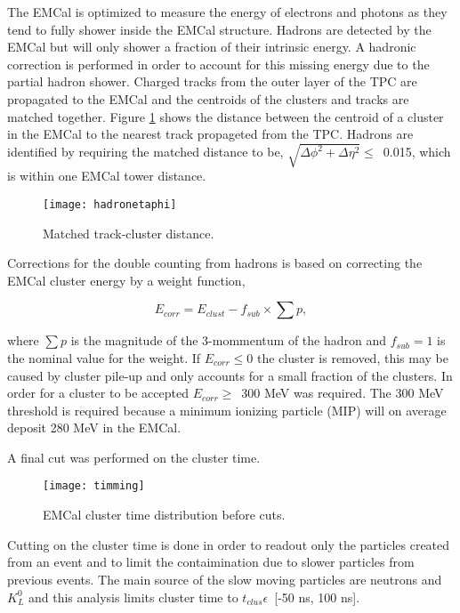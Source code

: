 The EMCal is optimized to measure the energy of electrons and photons as they tend to fully shower inside the EMCal structure.  Hadrons are detected by the EMCal but will only shower a fraction of their intrinsic energy.  A hadronic correction is performed in order to account for this missing energy due to the partial hadron shower.  Charged tracks from the outer layer of the TPC are propagated to the EMCal and the centroids of the clusters and tracks are matched together.  Figure \ref{fig:EMChadetaphi} shows the distance between the centroid of a cluster in the EMCal to the nearest track propageted from the TPC.  Hadrons are identified by requiring the matched distance to be, $\sqrt{ \Delta\phi^{2} + \Delta\eta^{2} } \leq \,$ 0.015, which is within one EMCal tower distance.

\begin{figure}[h]
\texttt{[image: hadronetaphi]}
\centering
\caption{Matched track-cluster distance.}
\label{fig:EMChadetaphi}
\end{figure}

\noindent
Corrections for the double counting from hadrons is based on correcting the EMCal cluster energy by a weight function,

\begin{equation}
E_{corr} = E_{clust} - f_{sub} \times \sum p ,
\label{eq:HadCorr}
\end{equation}

\noindent
where $\sum p$ is the magnitude of the 3-mommentum of the hadron and $f_{sub} = 1$ is the nominal value for the weight.  If $E_{corr} \leq 0$ the cluster is removed, this may be caused by cluster pile-up and only accounts for a small fraction of the clusters.  In order for a cluster to be accepted $E_{corr} \geq \,$ 300 MeV was required.  The 300 MeV threshold is required because a minimum ionizing particle (MIP) will on average deposit 280 MeV in the EMCal.  

A final cut was performed on the cluster time.  
\begin{figure}[h]
\texttt{[image: timming]}
\centering
\caption{EMCal cluster time distribution before cuts.}
\label{fig:EMCaltime}
\end{figure}

\noindent
Cutting on the cluster time is done in order to readout only the particles created from an event and to limit the contaimination due to slower particles from previous events.  The main source of the slow moving particles are neutrons and $K_{L}^{0}$ and this analysis limits cluster time to $t_{clus} \epsilon \,$ [-50 ns, 100 ns].


